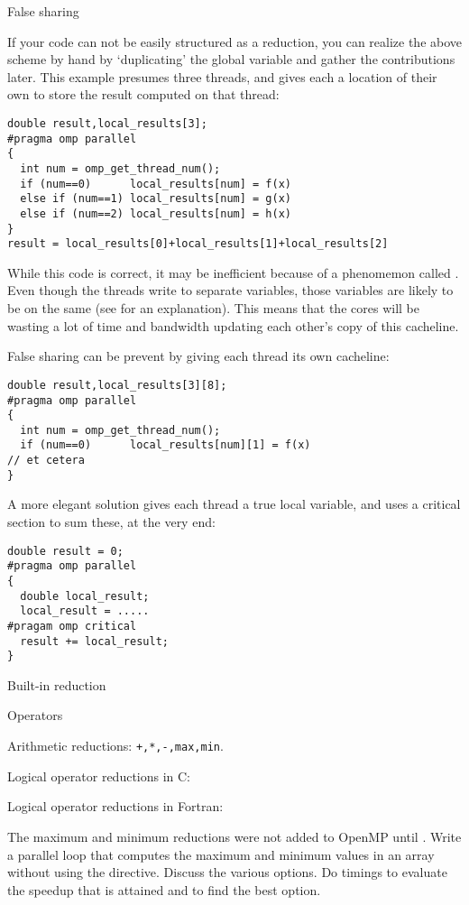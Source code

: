  {False sharing}

If your code can not be easily structured as a reduction, you can 
realize the above scheme by hand by
`duplicating' the global variable and gather the contributions later.
This example presumes three threads, and gives each a location of their
own to store the result computed on that thread:
\begin{lstlisting}
double result,local_results[3];
#pragma omp parallel
{
  int num = omp_get_thread_num();
  if (num==0)      local_results[num] = f(x)
  else if (num==1) local_results[num] = g(x)
  else if (num==2) local_results[num] = h(x)
}
result = local_results[0]+local_results[1]+local_results[2]
\end{lstlisting}
While this code is correct, it may be inefficient because of a
phenomemon called . Even though the threads write
to separate variables, those variables are likely to be on the same 
 (see  for an explanation).
This means that the cores will be wasting a lot of time and bandwidth updating
each other's copy of this cacheline.

False sharing can be prevent by giving each thread its own cacheline:
\begin{lstlisting}
double result,local_results[3][8];
#pragma omp parallel
{
  int num = omp_get_thread_num();
  if (num==0)      local_results[num][1] = f(x)
// et cetera
}
\end{lstlisting}
A more elegant solution gives each thread a true local variable,
and uses a critical section to sum these, at the very end:
\begin{lstlisting}
double result = 0;
#pragma omp parallel
{
  double local_result;
  local_result = .....
#pragam omp critical
  result += local_result;
}
\end{lstlisting}

 {Built-in reduction}

 {Operators}

Arithmetic reductions: \lstinline{+,*,-,max,min}.

Logical operator reductions in C: \n{& && | || ^}

Logical operator reductions in Fortran:

\begin{exercise}
  The maximum and minimum reductions were not added to OpenMP until
  .
  Write a parallel loop that computes the maximum and
  minimum values in an array without using the  directive.
  Discuss the various options. Do timings
  to evaluate the speedup that is attained and to find the best option.
\end{exercise}

